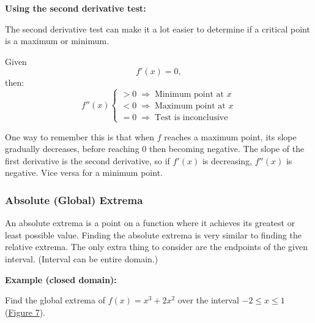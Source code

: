 \documentclass[12pt]{article}
\begin{document}
                \noindent \textbf{Using the second derivative test:}

                The second derivative test can make it a lot easier to determine if a critical point is a maximum or minimum.

                \noindent Given
                \[ f'(x) = 0, \]
                then:
                \[ f''(x) \begin{cases}
                    >0 \; \Rightarrow \; \text{Minimum point at $x$} \\
                    <0 \; \Rightarrow \; \text{Maximum point at $x$} \\
                    =0 \; \Rightarrow \; \text{Test is inconclusive}
                \end{cases} \]

                One way to remember this is that when $f$ reaches a maximum point, its slope gradually decreases, before reaching $0$ then becoming negative. The slope of the first derivative is the second derivative, so if $f'(x)$ is decreasing, $f''(x)$ is negative. Vice versa for a minimum point.

            \subsubsection{Absolute (Global) Extrema}
                An absolute extrema is a point on a function where it achieves its greatest or least possible value. Finding the absolute extrema is very similar to finding the relative extrema. The only extra thing to consider are the endpoints of the given interval. (Interval can be entire domain.)

                \noindent \textbf{Example (closed domain):}

                \noindent Find the global extrema of $f(x) = x^3+2x^2$ over the interval $-2 \le x \le 1$ (\hyperref[fig:absextremaclosed]{Figure 7}).
\end{document}
